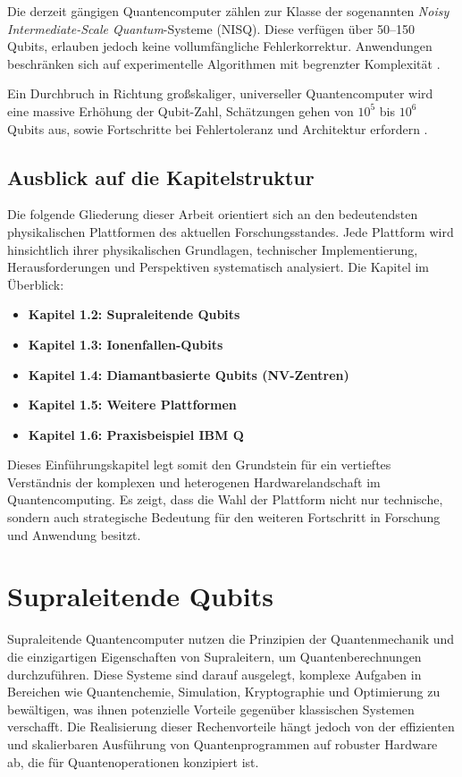 Die derzeit gängigen Quantencomputer zählen zur Klasse der sogenannten \textit{Noisy Intermediate-Scale Quantum}-Systeme (NISQ). Diese verfügen über 50–150 Qubits, erlauben jedoch keine vollumfängliche Fehlerkorrektur. Anwendungen beschränken sich auf experimentelle Algorithmen mit begrenzter Komplexität \cite{schmaltz2025, homeister2020}.

Ein Durchbruch in Richtung großskaliger, universeller Quantencomputer wird eine massive Erhöhung der Qubit-Zahl, Schätzungen gehen von $10^5$ bis $10^6$ Qubits aus, sowie Fortschritte bei Fehlertoleranz und Architektur erfordern \cite{schmaltz2025}.

\subsection{Ausblick auf die Kapitelstruktur}
Die folgende Gliederung dieser Arbeit orientiert sich an den bedeutendsten physikalischen Plattformen des aktuellen Forschungsstandes. Jede Plattform wird hinsichtlich ihrer physikalischen Grundlagen, technischer Implementierung, Herausforderungen und Perspektiven systematisch analysiert. Die Kapitel im Überblick:

\begin{itemize}
\item \textbf{Kapitel 1.2: Supraleitende Qubits}
\item \textbf{Kapitel 1.3: Ionenfallen-Qubits}
\item \textbf{Kapitel 1.4: Diamantbasierte Qubits (NV-Zentren)}
\item \textbf{Kapitel 1.5: Weitere Plattformen} 
\item \textbf{Kapitel 1.6: Praxisbeispiel IBM Q}
\end{itemize}

Dieses Einführungskapitel legt somit den Grundstein für ein vertieftes Verständnis der komplexen und heterogenen Hardwarelandschaft im Quantencomputing. Es zeigt, dass die Wahl der Plattform nicht nur technische, sondern auch strategische Bedeutung für den weiteren Fortschritt in Forschung und Anwendung besitzt.

\section{Supraleitende Qubits}
Supraleitende Quantencomputer nutzen die Prinzipien der Quantenmechanik und die einzigartigen Eigenschaften von Supraleitern, um Quantenberechnungen durchzuführen. Diese Systeme sind darauf ausgelegt, komplexe Aufgaben in Bereichen wie Quantenchemie, Simulation, Kryptographie und Optimierung zu bewältigen, was ihnen potenzielle Vorteile gegenüber klassischen Systemen verschafft. Die Realisierung dieser Rechenvorteile hängt jedoch von der effizienten und skalierbaren Ausführung von Quantenprogrammen auf robuster Hardware ab, die für Quantenoperationen konzipiert ist.
